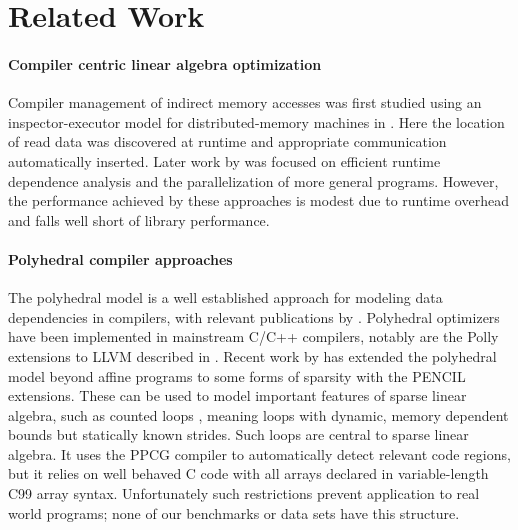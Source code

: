 \section{Related Work}
\label{sec:relatedwork}

\paragraph*{Compiler centric linear algebra optimization}
    Compiler management of indirect memory accesses was first studied using an
    inspector-executor model for distributed-memory machines in
    \citet{Baxter:1989:RPS:72935.72967}.
    Here the location of read data was discovered at runtime and appropriate
    communication automatically inserted.
    Later work by \citet{pottenger1995idiom,fisher1994parallelizing,
    rauchwerger1999lrpd,suganuma1996detection} was focused on efficient runtime
    dependence analysis and the parallelization of more general programs.
    However, the performance achieved by these approaches is modest due to
    runtime overhead and falls well short of library performance.

\paragraph*{Polyhedral compiler approaches}
    The polyhedral model is a well established approach for modeling data
    dependencies in compilers, with relevant publications by
    \citet{redon1994scheduling, jouvelot1989unified,
    chi1997optimizing, gupta2006simplifying, stock2014framework}.
    Polyhedral optimizers have been implemented in mainstream C/C++ compilers,
    notably are the Polly extensions to LLVM described in
    \cite{Doerfert2015Polly}.
    Recent work by \citet{7429301} has extended the polyhedral model beyond
    affine programs to some forms of sparsity with the PENCIL extensions.
    These can be used to model important features of sparse linear algebra, such
    as counted loops \citep{Zhao:2018:PCF:3178372.3179509}, meaning loops with
    dynamic, memory dependent bounds but statically known strides.
    Such loops are central to sparse linear algebra.
    It uses the PPCG compiler \citep{Verdoolaege:2013:PPC:2400682.2400713} to
    automatically detect relevant code regions, but it relies on well behaved C
    code with all arrays declared in variable-length C99 array syntax.
    Unfortunately such restrictions prevent application to real world programs;
    none of our benchmarks or data sets have this structure.

